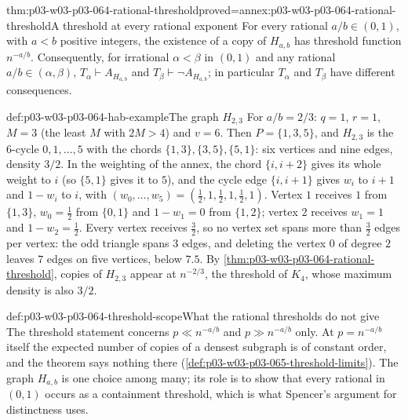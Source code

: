 \begin{hbcorollary}{thm:p03-w03-p03-064-rational-threshold}{proved=annex:p03-w03-p03-064-rational-threshold}{A threshold at every rational exponent}
For every rational \(a/b\in(0,1)\), with \(a<b\) positive integers, the
existence of a copy of \(H_{a,b}\) has threshold function \(n^{-a/b}\).
Consequently, for irrational \(\alpha<\beta\) in \((0,1)\) and any rational
\(a/b\in(\alpha,\beta)\), \(T_\alpha\vdash A_{H_{a,b}}\) and
\(T_\beta\vdash\neg A_{H_{a,b}}\); in particular \(T_\alpha\) and
\(T_\beta\) have different consequences.
\end{hbcorollary}

\begin{hbexample}{def:p03-w03-p03-064-hab-example}{The graph \(H_{2,3}\)}
For \(a/b=2/3\): \(q=1\), \(r=1\), \(M=3\) (the least \(M\) with
\(2M>4\)) and \(v=6\).  Then \(P=\{1,3,5\}\), and \(H_{2,3}\) is the
\(6\)-cycle \(0,1,\ldots,5\) with the chords \(\{1,3\},\{3,5\},\{5,1\}\):
six vertices and nine edges, density \(3/2\).  In the weighting of the annex,
the chord \(\{i,i+2\}\) gives its whole weight to \(i\) (so \(\{5,1\}\) gives
it to \(5\)), and the cycle edge \(\{i,i+1\}\) gives \(w_i\) to \(i+1\) and
\(1-w_i\) to \(i\), with \((w_0,\ldots,w_5)=(\tfrac12,1,\tfrac12,1,\tfrac12,1)\).
Vertex \(1\) receives \(1\) from \(\{1,3\}\), \(w_0=\frac12\) from
\(\{0,1\}\) and \(1-w_1=0\) from \(\{1,2\}\); vertex \(2\) receives \(w_1=1\)
and \(1-w_2=\frac12\).  Every vertex receives \(\frac32\), so no vertex set
spans more than \(\frac32\) edges per vertex: the odd triangle spans \(3\)
edges, and deleting the vertex \(0\) of degree \(2\) leaves \(7\) edges on
five vertices, below \(7.5\).  By
\cref{thm:p03-w03-p03-064-rational-threshold}, copies of \(H_{2,3}\) appear
at \(n^{-2/3}\), the threshold of \(K_4\), whose maximum density is also
\(3/2\).
\end{hbexample}

\begin{hbwarning}{def:p03-w03-p03-064-threshold-scope}{What the rational thresholds do not give}
The threshold statement concerns \(p\ll n^{-a/b}\) and \(p\gg n^{-a/b}\)
only.  At \(p=n^{-a/b}\) itself the expected number of copies of a densest
subgraph is of constant order, and the theorem says nothing there
(\cref{def:p03-w03-p03-065-threshold-limits}).  The graph \(H_{a,b}\) is one
choice among many; its role is to show that every rational in \((0,1)\)
occurs as a containment threshold, which is what Spencer's argument for
distinctness uses.
\end{hbwarning}

